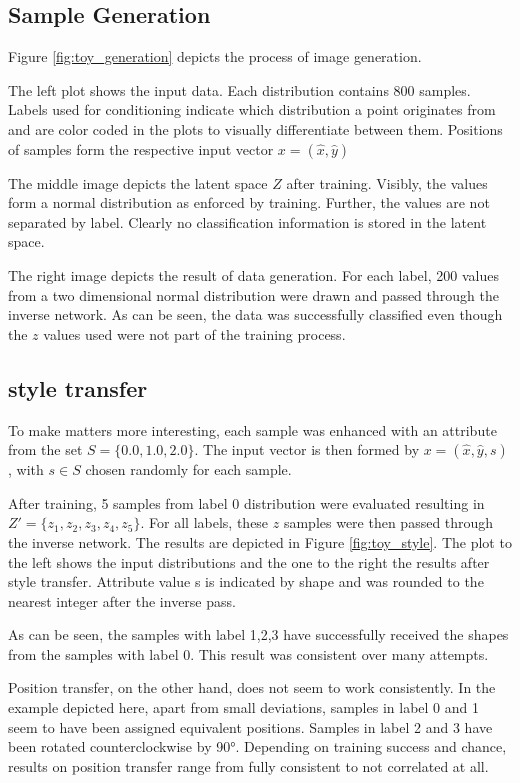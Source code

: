 \documentclass[final]{cvpr}
\begin{document}
\subsection{Sample Generation}\label{sec:toy_sample}
Figure \ref{fig:toy_generation} depicts the process of image generation. 

The left plot shows the input data. Each distribution contains 800 samples. Labels used for conditioning indicate which distribution a point originates from and are color coded in the plots to visually differentiate between them.
Positions of samples form the respective input vector $x = (\hat{x}, \hat{y})$

The middle image depicts the latent space $Z$ after training. Visibly, the values form a normal distribution as enforced by training. Further, the values are not separated by label. Clearly no classification information is stored in the latent space.

The right image depicts the result of data generation. For each label, 200 values from a two dimensional normal distribution were drawn and passed through the inverse network.
As can be seen, the data was successfully classified even though the $z$ values used were not part of the training process.

\subsection{style transfer}
To make matters more interesting, each sample was enhanced with an attribute from the set $S = \{0.0, 1.0, 2.0\}$. The input vector is then formed by $x = (\hat{x}, \hat{y}, s)$, with $s \in S$ chosen randomly for each sample.

After training, 5 samples from label 0 distribution were evaluated resulting in $Z'=\{z_1, z_2, z_3, z_4, z_5\}$. For all labels, these $z$ samples were then passed through the inverse network. 
The results are depicted in Figure \ref{fig:toy_style}. The plot to the left shows the input distributions and the one to the right the results after style transfer. 
Attribute value s is indicated by shape and was rounded to the nearest integer after the inverse pass.

As can be seen, the samples with label 1,2,3 have successfully received the shapes from the samples with label 0. This result was consistent over many attempts. 

Position transfer, on the other hand, does not seem to work consistently. In the example depicted here, apart from small deviations, samples in label 0 and 1 seem to have been assigned equivalent positions. Samples in label 2 and 3 have been rotated counterclockwise by 90°.
Depending on training success and chance, results on position transfer range from fully consistent to not correlated at all.
\end{document}
